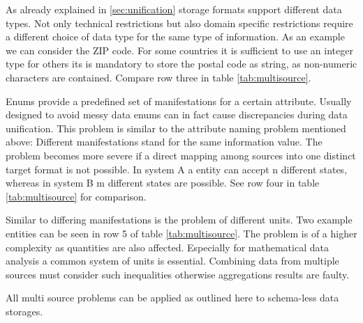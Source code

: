 As already explained in \ref{sec:unification} storage formats support different data types. Not only technical restrictions but also domain specific restrictions require a different choice of data type for the same type of information. As an example we can consider the ZIP code. For some countries it is sufficient to use an integer type for others its is mandatory to store the postal code as string, as non-numeric characters are contained. Compare row three in table \ref{tab:multisource}. 

Enums provide a predefined set of manifestations for a certain attribute. Usually designed to avoid messy data enums can in fact cause discrepancies during data unification. This problem is similar to the attribute naming problem mentioned above: Different manifestations stand for the same information value. The problem becomes more severe if a direct mapping among sources into one distinct target format is not possible. In system A a entity can accept n different states, whereas in system B m different states are possible. See row four in table \ref{tab:multisource} for comparison.

Similar to differing manifestations is the problem of different units. Two example entities can be seen in row 5 of table \ref{tab:multisource}. The problem is of a higher complexity as quantities are also affected. Especially for mathematical data analysis a common system of units is essential. Combining data from multiple sources must consider such inequalities otherwise aggregations results are faulty.

All multi source problems can be applied as outlined here to schema-less data storages. 

